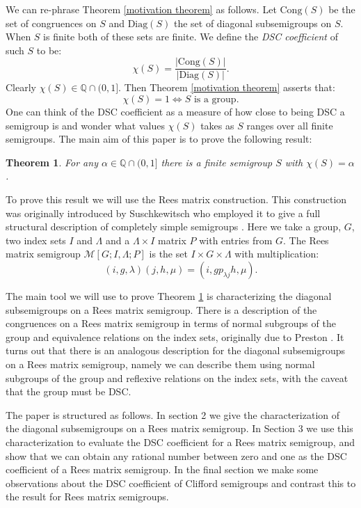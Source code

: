 \documentclass[a4paper, 12pt,reqno]{amsart}
\theoremstyle{plain}
\newtheorem{thm}{Theorem}[section]
\theoremstyle{definition}
\theoremstyle{remark}
\newcommand{\Q}{\mathbb{Q}}
\newcommand{\RM}{\mathcal{M}[G;I,\Lambda;P]}
\newcommand{\Cong}{\text{Cong}}
\newcommand{\Diag}{\text{Diag}}
\begin{document}
We can re-phrase Theorem \ref{motivation theorem} as follows.
Let $\Cong(S)$ be the set of congruences on $S$ and $\Diag(S)$ the set of diagonal subsemigroups on $S$.
When $S$ is finite both of these sets are finite. We define the \textit{DSC coefficient} of such $S$ to be:
\begin{equation*}
    \chi(S)  =\frac{|\Cong(S)|}{|\Diag(S)|}.
\end{equation*}
Clearly $\chi(S) \in \Q \cap (0,1]$.
Then Theorem \ref{motivation theorem} asserts that:
\begin{equation*}
    \chi(S) = 1 \iff S \text{ is a group}.
\end{equation*}
One can think of the DSC coefficient as a measure of how close to being DSC a semigroup is and wonder what values $\chi(S)$ takes as $S$ ranges over all finite semigroups.
The main aim of this paper is to prove the following result:
\begin{thm}
    \label{Main Theorem}
    For any $\alpha \in \Q \cap (0,1]$ there is a finite semigroup $S$ with $\chi(S) = \alpha$.
\end{thm}

To prove this result we will use the Rees matrix construction.
This construction was originally introduced by Suschkewitsch who employed it to give a full structural description of completely simple semigroups \cite{Su28}.
Here we take a group, $G$, two index sets $I$ and $\Lambda$ and a $\Lambda \times I$ matrix $P$ with entries from $G$.
The Rees matrix semigroup $\RM$ is the set $I \times G \times \Lambda$ with multiplication:
\begin{equation*}
    (i,g,\lambda)(j,h,\mu) = (i , g p_{\lambda j} h ,\mu).
\end{equation*}

The main tool we will use to prove Theorem \ref{Main Theorem} is characterizing the diagonal subsemigroups on a Rees matrix semigroup.
There is a description of the congruences on a Rees matrix semigroup in terms of normal subgroups of the group and equivalence relations on the index sets, originally due to Preston \cite{Preston_1961}.
It turns out that there is an analogous description for the diagonal subsemigroups on a Rees matrix semigroup, namely we can describe them using normal subgroups of the group and reflexive relations on the index sets, with the caveat that the group must be DSC. 

The paper is structured as follows. In section 2 we give the characterization of the diagonal subsemigroups on a Rees matrix semigroup.
In Section 3 we use this characterization to evaluate the DSC coefficient for a Rees matrix semigroup, and show that we can obtain any rational number between zero and one as the DSC coefficient of a Rees matrix semigroup.
In the final section we make some observations about the DSC coefficient of Clifford semigroups and contrast this to the result for Rees matrix semigroups.
\end{document}
